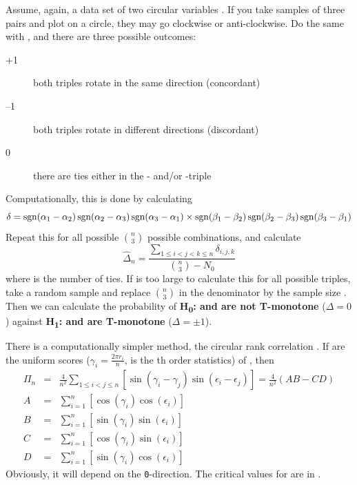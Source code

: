 \begin{refsection}
Assume, again, a data set of two circular variables \skalar{\alpha, \beta}. If you take samples of three pairs and plot  on a circle, they may go clockwise or anti-clockwise. Do the same with , and there are three possible outcomes:
\begin{description}
  \item[+1]{both triples rotate in the same direction (concordant)}
  \item[--1]{both triples rotate in different directions (discordant)}
  \item[0]{there are ties either in the \skalar{\alpha}- and/or \skalar{\beta}-triple }
\end{description}
Computationally, this is done by calculating
\begin{equation}
  \delta = \operatorname{sgn}(\alpha_1 - \alpha_2) \operatorname{sgn}(\alpha_2 - \alpha_3) \operatorname{sgn}(\alpha_3 - \alpha_1) \times \operatorname{sgn}(\beta_1 - \beta_2) \operatorname{sgn}(\beta_2 - \beta_3) \operatorname{sgn}(\beta_3 - \beta_1)
\end{equation}
Repeat this for all possible \(\binom{n}{3}\) possible combinations, and calculate
\begin{equation}
  \hat{\Delta}_n = \frac{\sum_{1 \leq i < j < k \leq n}\delta_{i,j,k}}{\binom{n}{3} - N_0}
\end{equation}
where  is the number of ties. If  is too large to calculate this for all possible triples, take a random sample and replace \(\binom{n}{3}\) in the denominator by the sample size . Then we can calculate the probability of \textbf{H\textsubscript{0}: \skalar{\alpha} and \skalar{\beta} are not T-monotone } (\(\Delta = 0\)) against \textbf{H\textsubscript{1}: \skalar{\alpha} and \skalar{\beta} are T-monotone} (\(\Delta = \pm 1\)).

There is a computationally simpler method, the circular rank correlation . If  are the uniform scores (\( \gamma_i = \frac{2 \pi r_i}{n} \),  is the th order statistics) of , then
\begin{eqnarray}
  \Pi_n &=& \frac{4}{n^2} \sum_{1 \leq i < j \leq n} [\sin(\gamma_i - \gamma_j) \sin(\epsilon_i - \epsilon_j)]  = \frac{4}{n^2} (AB - CD)                       \\
  A        &=& \sum_{i=1}^n[\cos(\gamma_i) \cos(\epsilon_i)] \\
  B        &=& \sum_{i=1}^n[\sin(\gamma_i) \sin(\epsilon_i)] \\
  C        &=& \sum_{i=1}^n[\cos(\gamma_i) \sin(\epsilon_i)] \\
  D        &=& \sum_{i=1}^n[\sin(\gamma_i) \cos(\epsilon_i)]
\end{eqnarray}
Obviously, it will depend on the \texttt{0}-direction. The critical values for  are in \parencite[table A13]{Fis-93}.


\end{refsection}
